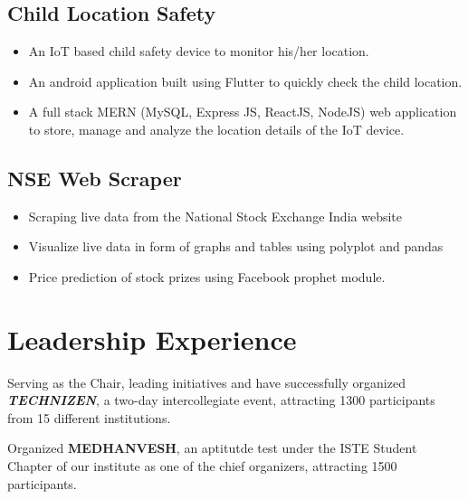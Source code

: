 \documentclass[]{roshan-resume}
\begin{document}
\begin{minipage}[t]{0.66\textwidth}
		\subsection{Child Location Safety} 
		\begin{itemize}
			\item An IoT based child safety device to monitor his/her location.
			\item An android application built using Flutter to quickly check the child location.
			\item A full stack MERN (MySQL, Express JS, ReactJS, NodeJS) web application to store, manage and analyze the location details of the IoT device.
		\end{itemize}
		
		\subsection{NSE Web Scraper}
		\begin{itemize}
			\item Scraping live data from the National Stock Exchange India website
			\item Visualize live data in form of graphs and tables using polyplot and pandas
			\item Price prediction of stock prizes using Facebook prophet module.
		\end{itemize}
		
		\section{Leadership Experience}
		 \hfill {}
		\begin{tightemize}
			\item Serving as the Chair, leading initiatives and have successfully organized \textbf{\textit{TECHNIZEN}}, a two-day intercollegiate event, attracting 1300 participants from 15 different institutions.
		\end{tightemize}
		\hfill {}
		\begin{tightemize}
			\item Organized \textbf{MEDHANVESH}, an aptitutde test under the ISTE Student Chapter of our institute as one of the chief organizers, attracting 1500 participants.
		\end{tightemize}
		

\end{minipage}
\end{document}
